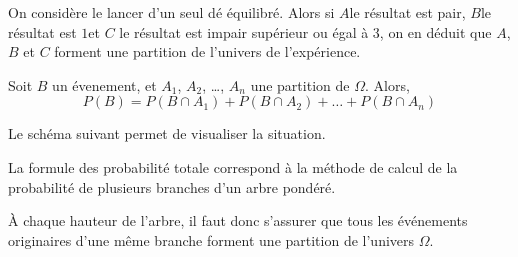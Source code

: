 \documentclass{article}
\begin{document}
\begin{example}
On considère le lancer d'un seul dé équilibré. Alors si $A$\og le résultat est pair\fg, $B$\og le résultat est $1$\fg et $C$ \og le résultat est impair supérieur ou égal à $3$\fg, on en déduit que $A$, $B$ et $C$ forment une partition de l'univers de l'expérience.
\end{example}

\begin{proposition}
Soit $B$ un évenement, et $A_1$, $A_2$, \dots, $A_n$ une partition de $\Omega$. Alors,
\begin{equation*}
P(B) = P(B \cap A_1) + P(B \cap A_2) + \dots + P(B \cap A_n)
\end{equation*}
\end{proposition}

\begin{remark}
Le schéma suivant permet de visualiser la situation.
\begin{center}
\end{center}
\end{remark}

\begin{remark}
La formule des probabilité totale correspond à la méthode de calcul de la probabilité de plusieurs branches d'un arbre pondéré.

À chaque hauteur de l'arbre, il faut donc s'assurer que tous les événements originaires d'une même branche forment une partition de l'univers $\Omega$. 
\end{remark}
\end{document}
